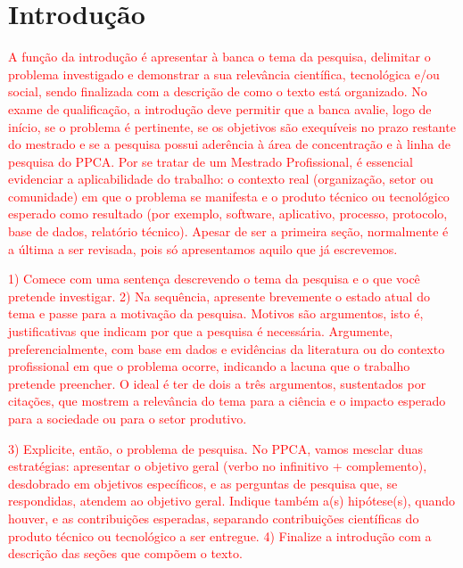 \section{Introdução}
\label{sec:introducao}



\textcolor{red}{A função da introdução é apresentar à banca o tema da pesquisa, delimitar o problema investigado e demonstrar a sua relevância científica, tecnológica e/ou social, sendo finalizada com a descrição de como o texto está organizado. No exame de qualificação, a introdução deve permitir que a banca avalie, logo de início, se o problema é pertinente, se os objetivos são exequíveis no prazo restante do mestrado e se a pesquisa possui aderência à área de concentração e à linha de pesquisa do PPCA. Por se tratar de um Mestrado Profissional, é essencial evidenciar a aplicabilidade do trabalho: o contexto real (organização, setor ou comunidade) em que o problema se manifesta e o produto técnico ou tecnológico esperado como resultado (por exemplo, software, aplicativo, processo, protocolo, base de dados, relatório técnico). Apesar de ser a primeira seção, normalmente é a última a ser revisada, pois só apresentamos aquilo que já escrevemos.}

\textcolor{red}{1) Comece com uma sentença descrevendo o tema da pesquisa e o que você pretende investigar. 2) Na sequência, apresente brevemente o estado atual do tema e passe para a motivação da pesquisa. Motivos são argumentos, isto é, justificativas que indicam por que a pesquisa é necessária. Argumente, preferencialmente, com base em dados e evidências da literatura ou do contexto profissional em que o problema ocorre, indicando a lacuna que o trabalho pretende preencher. O ideal é ter de dois a três argumentos, sustentados por citações, que mostrem a relevância do tema para a ciência e o impacto esperado para a sociedade ou para o setor produtivo.}

\textcolor{red}{3) Explicite, então, o problema de pesquisa. No PPCA, vamos mesclar duas estratégias: apresentar o objetivo geral (verbo no infinitivo + complemento), desdobrado em objetivos específicos, e as perguntas de pesquisa que, se respondidas, atendem ao objetivo geral. Indique também a(s) hipótese(s), quando houver, e as contribuições esperadas, separando contribuições científicas do produto técnico ou tecnológico a ser entregue. 4) Finalize a introdução com a descrição das seções que compõem o texto.}

